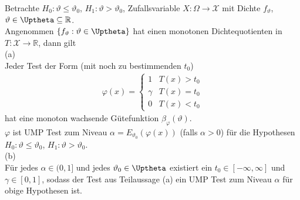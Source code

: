 \documentclass[a4paper,openany]{book}
\theoremstyle{mytheoremstyle}
\theoremstyle{mytheoremstyle2}
\begin{document}
\begin{theo}{10.4}{}
  Betrachte $H_0:\vartheta \leq \vartheta _0$, $H_1:\vartheta >\vartheta _0$, Zufallsvariable $X:\Omega \to \mathcal{X}$ mit Dichte $f _{\vartheta }$, $\vartheta \in \Uptheta \subseteq \mathbb{R}$. \\
  Angenommen $\{f _{\vartheta }:\vartheta \in \Uptheta\}$ hat einen monotonen Dichtequotienten in $T:\mathcal{X}\to \mathbb{R}$, dann gilt \\
  (a) \\
  Jeder Test der Form (mit noch zu bestimmenden $t_0$)
  \begin{align*}
    \varphi (x)=\begin{cases}
      1 &T(x)>t_0\\
      \gamma & T(x)=t_0\\
      0&T(x)<t_0
    \end{cases}
  \end{align*}
  hat eine monoton wachsende Gütefunktion $\beta _{\varphi }(\vartheta )$. \\
  $\varphi $ ist UMP Test zum Niveau $\alpha =E _{\vartheta _0}(\varphi (x))$ (falls $\alpha >0$) 
  für die Hypothesen $H_0:\vartheta \leq \vartheta _0$, $H_1:\vartheta >\vartheta _0$. \\
  (b)\\
  Für jedes $\alpha \in (0,1]$ und jedes $\vartheta _0 \in \Uptheta$ existiert ein $t_0 \in [-\infty ,\infty ]$ und $\gamma \in [0,1]$, sodass der Test aus Teilaussage (a) ein UMP Test zum Niveau $\alpha $ für obige Hypothesen ist.
\end{theo}
\end{document}
